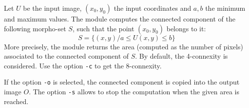 Let $U$ be the input image, $(x_0,y_0)$ the input coordinates and
$a,b$ the minimum and maximum values.
The module computes the connected component of the following morpho-set $S$, such
that the point $(x_0,y_0)$ belongs to it:
\[
S = \{ (x,y) / a \leq U(x,y) \leq b \}
\]
More precisely, the module returns the area (computed as the number of pixels)
associated to the connected component of $S$.
By default, the 4-connexity is considered. Use the option  \verb+-c+ 
to get the 8-connexity.

If the option \verb+-o+ is selected, the connected component is copied into
the output image $O$.
The option \verb+-s+ allows to stop the computation when the given area
is reached.
